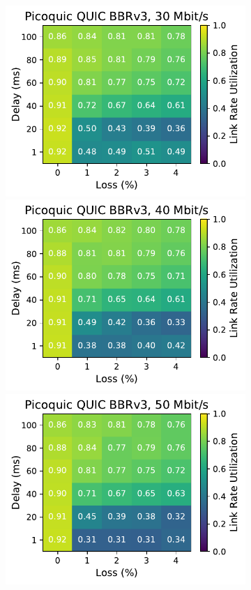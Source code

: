 \begin{figure}[ht]
\begin{subfigure}[b]{0.22\linewidth}
        \includegraphics[width=\linewidth,trim={0 0 2cm 0},clip]{figures/heatmaps/heatmap_picoquic_bbr3_30mbps.pdf}
        \includegraphics[width=\linewidth,trim={0 0 2cm 0},clip]{figures/heatmaps/heatmap_picoquic_bbr3_40mbps.pdf}
        \includegraphics[width=\linewidth,trim={0 0 2cm 0},clip]{figures/heatmaps/heatmap_picoquic_bbr3_50mbps.pdf}

\end{subfigure}
\end{figure}
